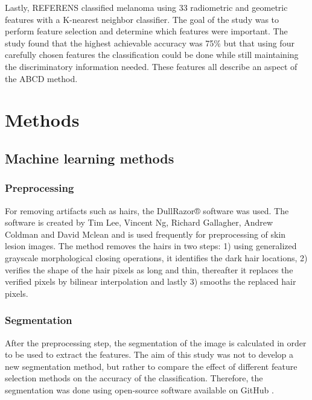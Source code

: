 \documentclass{kththesis}
\begin{document}
Lastly, REFERENS classified melanoma using 33 radiometric and geometric features with a K-nearest neighbor classifier. The goal of the study was to perform feature selection and determine which features were important. The study found that the highest achievable accuracy was 75\% but that using four carefully chosen features the classification could be done while still maintaining the discriminatory information needed. These features all describe an aspect of the ABCD method. %


\chapter{Methods}

\section{Machine learning methods}

\subsection{Preprocessing}

For removing artifacts such as hairs, the DullRazor® software was used. The software is created by Tim Lee, Vincent Ng, Richard Gallagher, Andrew Coldman and David Mclean and is used frequently for preprocessing of skin lesion images. The method removes the hairs in two steps: 1) using generalized grayscale morphological closing operations, it identifies the dark hair locations, 2) verifies the shape of the hair pixels as long and thin, thereafter it replaces the verified pixels by bilinear interpolation and lastly 3) smooths the replaced hair pixels. \parencite{dermwebDullRazor} %


\subsection{Segmentation}


After the preprocessing step, the segmentation of the image is calculated in order to be used to extract the features.
The aim of this study was not to develop a new segmentation method, but rather to compare the effect of different feature selection methods on the accuracy of the classification. Therefore, the segmentation was done using open-source software available on GitHub \parencite{melanoma-classifier}. 
\end{document}
